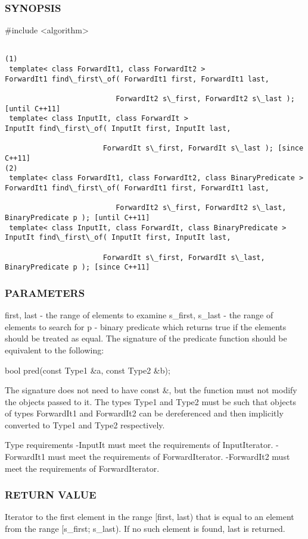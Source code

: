 \subsubsection{SYNOPSIS}
\#include <algorithm>

\begin{lstlisting}

(1)
 template< class ForwardIt1, class ForwardIt2 >
ForwardIt1 find\_first\_of( ForwardIt1 first, ForwardIt1 last,

                          ForwardIt2 s\_first, ForwardIt2 s\_last ); [until C++11]
 template< class InputIt, class ForwardIt >
InputIt find\_first\_of( InputIt first, InputIt last,

                       ForwardIt s\_first, ForwardIt s\_last ); [since C++11]
(2)
 template< class ForwardIt1, class ForwardIt2, class BinaryPredicate >
ForwardIt1 find\_first\_of( ForwardIt1 first, ForwardIt1 last,

                          ForwardIt2 s\_first, ForwardIt2 s\_last, BinaryPredicate p ); [until C++11]
 template< class InputIt, class ForwardIt, class BinaryPredicate >
InputIt find\_first\_of( InputIt first, InputIt last,

                       ForwardIt s\_first, ForwardIt s\_last, BinaryPredicate p ); [since C++11]
\end{lstlisting}

\subsubsection{PARAMETERS}
first, last - the range of elements to examine
s\_first, s\_last - the range of elements to search for
p - binary predicate which returns true  if the elements should be treated as equal.
The signature of the predicate function should be equivalent to the following:

 bool pred(const Type1 \&a, const Type2 \&b);

The signature does not need to have const \&, but the function must not modify the objects passed to it.
The types Type1 and Type2 must be such that objects of types ForwardIt1 and ForwardIt2 can be dereferenced and then implicitly converted to Type1 and Type2 respectively.


 Type requirements
 -InputIt must meet the requirements of InputIterator.
 -ForwardIt1 must meet the requirements of ForwardIterator.
 -ForwardIt2 must meet the requirements of ForwardIterator.

\subsubsection{RETURN VALUE}
Iterator to the first element in the range [first, last) that is equal to an element from the range [s\_first; s\_last). If no such element is found, last is returned.



